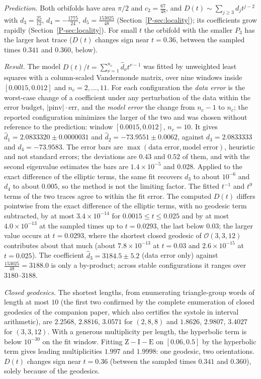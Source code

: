 \documentclass[pdflatex,sn-mathphys-num]{sn-jnl}
\newcommand{\Orb}{\mathcal{O}}
\newcommand{\cZ}{\mathrm{Z}}
\newcommand{\pref}[1]{\ref*{P-#1}}%
\theoremstyle{thmstyleone}%
\theoremstyle{thmstylethree}%
\providecommand{\Orb}{\mathcal{O}}
\providecommand{\cZ}{\mathrm{Z}}
\begin{document}
\emph{Prediction.} Both orbifolds have area $\pi/2$ and $c_2=\frac{67}{48}$, and $D(t)\sim\sum_{j\ge3}d_jt^{j-2}$ with $d_3=\frac{25}{12}$, $d_4=-\frac{1775}{24}$, $d_5=\frac{153025}{48}$ (Section~\pref{sec:locality}); its coefficients grow rapidly (Section~\pref{sec:locality}). For small $t$ the orbifold with the smaller $P_3$ has the larger heat trace ($D(t)$ changes sign near $t=0.36$, between the sampled times $0.341$ and $0.360$, below).

\emph{Result.} The model $D(t)/t=\sum_{\nu=1}^{n_c}\hat d_\nu t^{\nu-1}$ was fitted by unweighted least squares with a column-scaled Vandermonde matrix, over nine windows inside $[0.0015,0.012]$ and $n_c=2,\dots,11$. For each configuration the \emph{data error} is the worst-case change of a coefficient under any perturbation of the data within the error budget, $|\mathrm{pinv}|\cdot\mathrm{err}$, and the \emph{model error} the change from $n_c-1$ to $n_c$; the reported configuration minimizes the larger of the two and was chosen without reference to the prediction: window $[0.0015,0.012]$, $n_c=10$. It gives $\hat d_1=2.0833320\pm0.0000031$ and $\hat d_2=-73.9551\pm0.0062$, against $d_3=2.0833333$ and $d_4=-73.9583$. The error bars are $\max(\text{data error},\text{model error})$, heuristic and not standard errors; the deviations are $0.43$ and $0.52$ of them, and with the second eigenvalue estimates the bars are $1.4\times10^{-5}$ and $0.028$. Applied to the exact difference of the elliptic terms, the same fit recovers $d_3$ to about $10^{-6}$ and $d_4$ to about $0.005$, so the method is not the limiting factor. The fitted $t^{-1}$ and $t^0$ terms of the two traces agree to within the fit error. The computed $D(t)$ differs pointwise from the exact difference of the elliptic terms, with no geodesic term subtracted, by at most $3.4\times10^{-14}$ for $0.0015\le t\le0.025$ and by at most $4.0\times10^{-13}$ at the sampled times up to $t=0.0293$, the last below $0.03$; the larger value occurs at $t=0.0293$, where the shortest closed geodesic of $\Orb(3,3,12)$ contributes about that much (about $7.8\times10^{-13}$ at $t=0.03$ and $2.6\times10^{-15}$ at $t=0.025$). The coefficient $\hat d_3=3184.5\pm5.2$ (data error only) against $\frac{153025}{48}=3188.0$ is only a by-product; across stable configurations it ranges over $3180$--$3188$.

\emph{Closed geodesics.} The shortest lengths, from enumerating triangle-group words of length at most $10$ (the first two confirmed by the complete enumeration of closed geodesics of the companion paper, which also certifies the systole in interval arithmetic), are $2.2568$, $2.8816$, $3.0571$ for $(2,8,8)$ and $1.8626$, $2.9807$, $3.4027$ for $(3,3,12)$. With a generous multiplicity per length, the hyperbolic term is below $10^{-30}$ on the fit window. Fitting $\cZ-\mathrm I-\mathrm E$ on $[0.06,0.5]$ by the hyperbolic term gives leading multiplicities $1.997$ and $1.9998$: one geodesic, two orientations. $D(t)$ changes sign near $t=0.36$ (between the sampled times $0.341$ and $0.360$), solely because of the geodesics.
\end{document}
